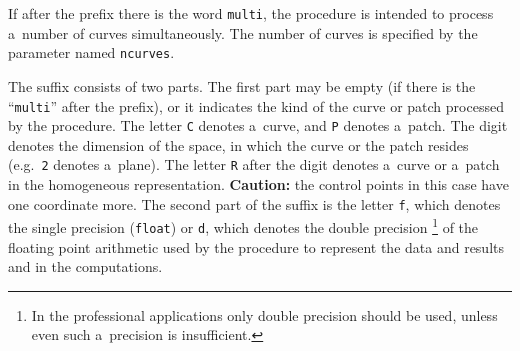 If after the prefix there is the word \texttt{multi}, the procedure
is intended to process a~number of curves simultaneously.
The number of curves is specified by the parameter named \texttt{ncurves}.

The suffix consists of two parts. The first part may be empty (if there is the
``\texttt{multi}'' after the prefix), or it indicates the kind of the
curve or patch processed by the procedure. The letter \texttt{C} denotes
a~curve, and \texttt{P} denotes a~patch. The digit denotes the dimension
of the space, in which the curve or the patch resides (e.g.\ \texttt{2}
denotes a~plane). The letter \texttt{R} after the digit denotes a~curve
or a~patch in the homogeneous representation. \textbf{Caution:}
the control points in this case have one coordinate more.
The second part of the suffix is the letter \texttt{f}, which denotes the single
precision (\texttt{float}) or \texttt{d}, which denotes the double precision%
\footnote{In the professional applications only double precision should be used,
unless even such a~precision is insufficient.}
of the floating point arithmetic used by the procedure to represent the data
and results and in the computations.

